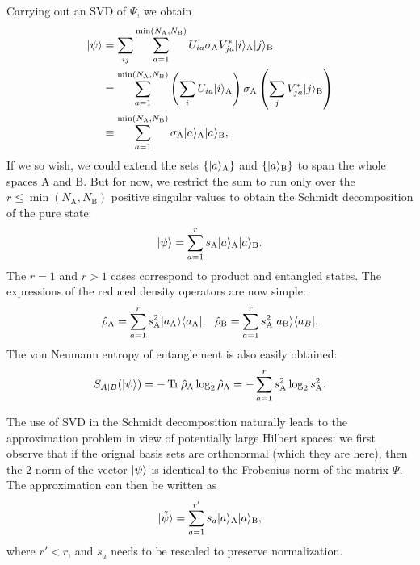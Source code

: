 \documentclass{article}
\begin{document}
Carrying out an SVD of $\Psi$, we obtain
\begin{align}
    |\psi\rangle&=\sum_{ij}\sum_{a=1}^{\min(N_{\mathrm{A}},N_{\mathrm{B}})}U_{ia}\sigma_{\mathrm{A}}V_{ja}^*|i\rangle_{\mathrm{A}}|j\rangle_{\mathrm{B}}\\
    &=\sum_{a=1}^{\min(N_{\mathrm{A}},N_{\mathrm{B}})}\left(\sum_iU_{ia}|i\rangle_{\mathrm{A}}\right)\sigma_{\mathrm{A}}\left(\sum_jV_{ja}^*|j\rangle_{\mathrm{B}}\right)\\
    &\equiv\sum_{a=1}^{\min(N_{\mathrm{A}},N_{\mathrm{B}})}\sigma_{\mathrm{A}}|a\rangle_{\mathrm{A}}|a\rangle_{\mathrm{B}},
\end{align}
If we so wish, we could extend the sets $\{ |a\rangle_{\mathrm{A}}\}$ and $\{|a\rangle_{\mathrm{B}}\}$ to span the whole spaces A and B. But for now, we restrict the sum to run only over the $r\leq\min(N_{\mathrm{A}},N_{\mathrm{B}})$ positive singular values to obtain the Schmidt decomposition of the pure state:
\begin{equation}
    |\psi\rangle=\sum_{a=1}^rs_{\mathrm{A}}|a\rangle_{\mathrm{A}}|a\rangle_{\mathrm{B}}.
\end{equation}
The $r=1$ and $r>1$ cases correspond to product and entangled states. The expressions of the reduced density operators are now simple:
\begin{equation}
    \hat{\rho}_{\mathrm{A}}=\sum_{a=1}^rs_{\mathrm{A}}^2|a_{\mathrm{A}}\ket \bra a_{\mathrm{A}}|,\ \ \hat{\rho}_{\mathrm{B}}=\sum_{a=1}^rs_{\mathrm{A}}^2|a_{\mathrm{B}}\ket \bra a_B|.
\end{equation}
The von Neumann entropy of entanglement is also easily obtained:
\begin{equation}
    S_{A|B}(|\psi\rangle)=-\operatorname{Tr}\hat{\rho}_{\mathrm{A}}\log_2\hat{\rho}_{\mathrm{A}}=-\sum_{a=1}^rs_{\mathrm{A}}^2\log_2s_{\mathrm{A}}^2.
\end{equation}

The use of SVD in the Schmidt decomposition naturally leads to the approximation problem in view of potentially large Hilbert spaces: we first observe that if the orignal basis sets are orthonormal (which they are here), then the $2$-norm of the vector $|\psi\rangle$ is identical to the Frobenius norm of the matrix $\Psi$. The approximation can then be written as
\begin{equation}
    |\tilde{\psi}\rangle=\sum_{a=1}^{r'}s_a|a\rangle_{\mathrm{A}}|a\rangle_{\mathrm{B}},
\end{equation}
where $r'<r$, and $s_a$ needs to be rescaled to preserve normalization.
\end{document}
